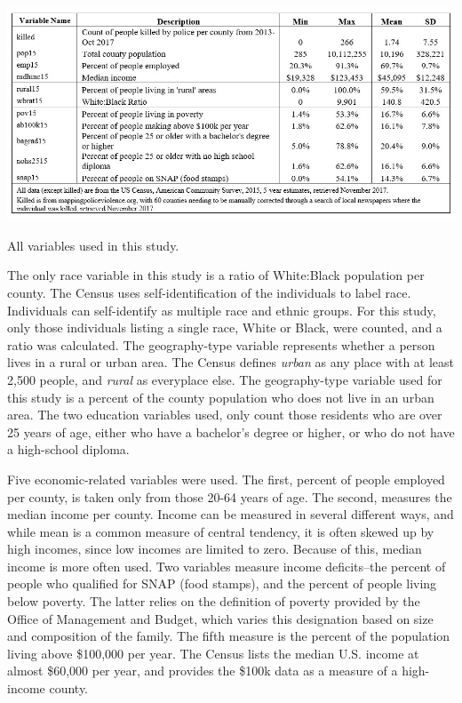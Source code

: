 \documentclass[sigconf]{acmart}
\begin{document}
\begin{table}
\includegraphics[width=1.0\textwidth]{images/table1.jpg}
\caption{All variables used in this study.}
\end{table}

The only race variable in this study is a ratio of White:Black population per county.  The Census uses self-identification of the individuals to label race.  Individuals can self-identify as multiple race and ethnic groups.  For this study, only those individuals listing a single race, White or Black, were counted, and a ratio was calculated.  The geography-type variable represents whether a person lives in a rural or urban area.  The Census defines {\em urban} as any place with at least 2,500 people, and {\em rural} as everyplace else.  The geography-type variable used for this study is a percent of the county population who does not live in an urban area.  The two education variables used, only count those residents who are over 25 years of age, either who have a bachelor's degree or higher, or who do not have a high-school diploma.  

Five economic-related variables were used.  The first, percent of people employed per county, is taken only from those 20-64 years of age.  The second, measures the median income per county.  Income can be measured in several different ways, and while mean is a common measure of central tendency, it is often skewed up by high incomes, since low incomes are limited to zero.  Because of this, median income is more often used.  Two variables measure income deficits--the percent of people who  qualified for SNAP (food stamps), and the percent of people living below poverty.  The latter relies on the definition of poverty provided by the Office of Management and Budget, which varies this designation based on size and composition of the family.  The fifth measure is the percent of the population living above \$100,000  per year. The Census lists the median U.S. income at almost \$60,000 per year, and provides the \$100k data as a measure of a high-income county.
\end{document}
